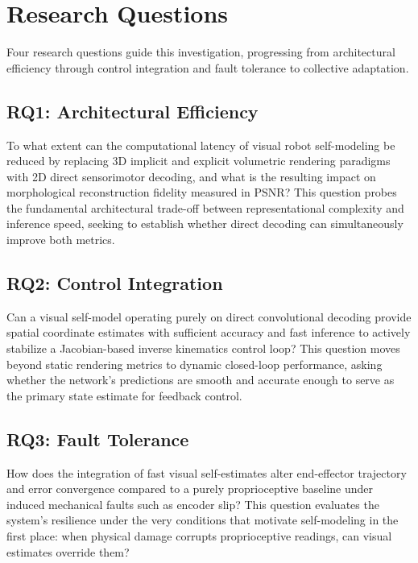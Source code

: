 \documentclass[12pt,a4paper,oneside]{report}
\begin{document}
\section{Research Questions}

Four research questions guide this investigation, progressing from architectural efficiency through control integration and fault tolerance to collective adaptation.

\subsection{RQ1: Architectural Efficiency}

To what extent can the computational latency of visual robot self-modeling be reduced by replacing 3D implicit and explicit volumetric rendering paradigms with 2D direct sensorimotor decoding, and what is the resulting impact on morphological reconstruction fidelity measured in PSNR? This question probes the fundamental architectural trade-off between representational complexity and inference speed, seeking to establish whether direct decoding can simultaneously improve both metrics.

\subsection{RQ2: Control Integration}

Can a visual self-model operating purely on direct convolutional decoding provide spatial coordinate estimates with sufficient accuracy and fast inference to actively stabilize a Jacobian-based inverse kinematics control loop? This question moves beyond static rendering metrics to dynamic closed-loop performance, asking whether the network's predictions are smooth and accurate enough to serve as the primary state estimate for feedback control.

\subsection{RQ3: Fault Tolerance}

How does the integration of fast visual self-estimates alter end-effector trajectory and error convergence compared to a purely proprioceptive baseline under induced mechanical faults such as encoder slip? This question evaluates the system's resilience under the very conditions that motivate self-modeling in the first place: when physical damage corrupts proprioceptive readings, can visual estimates override them?
\end{document}
